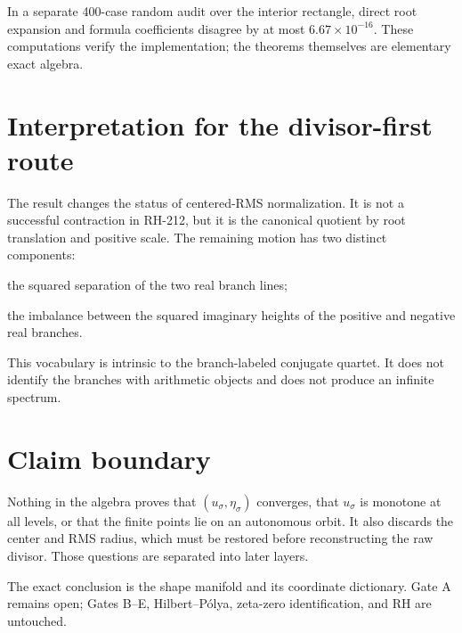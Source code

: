 \documentclass[12pt]{article}
\theoremstyle{remark}\newtheorem{remark}[theorem]{Remark}
\begin{document}
In a separate 400-case random audit over the interior rectangle, direct root
expansion and formula coefficients disagree by at most
$6.67\times10^{-16}$.  These computations verify the implementation; the
theorems themselves are elementary exact algebra.

\section{Interpretation for the divisor-first route}

The result changes the status of centered-RMS normalization.  It is not a
successful contraction in RH-212, but it is the canonical quotient by root
translation and positive scale.  The remaining motion has two distinct
components:
\begin{description}[leftmargin=3.2em,style=nextline]
\item[Axial coordinate $u$]
the squared separation of the two real branch lines;
\item[Asymmetry coordinate $\eta$]
the imbalance between the squared imaginary heights of the positive and
negative real branches.
\end{description}

This vocabulary is intrinsic to the branch-labeled conjugate quartet.  It
does not identify the branches with arithmetic objects and does not produce
an infinite spectrum.

\section{Claim boundary}

Nothing in the algebra proves that $(u_\sigma,\eta_\sigma)$ converges, that
$u_\sigma$ is monotone at all levels, or that the finite points lie on an
autonomous orbit.  It also discards the center and RMS radius, which must be
restored before reconstructing the raw divisor.  Those questions are
separated into later layers.

The exact conclusion is the shape manifold and its coordinate dictionary.
Gate A remains open; Gates B--E, Hilbert--P\'olya, zeta-zero identification,
and RH are untouched.


\end{document}
